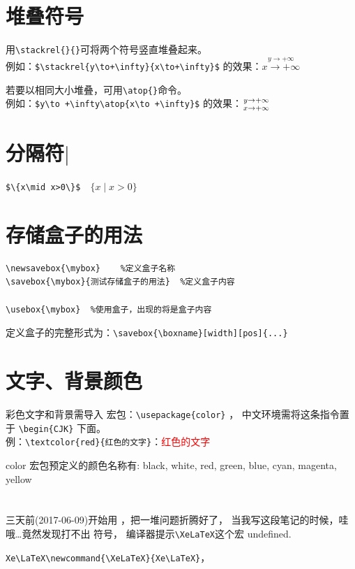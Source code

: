 \documentclass[a4paper,11pt]{article}
\begin{document}
\section{堆叠符号}
用\verb+\stackrel{}{}+可将两个符号竖直堆叠起来。\\
例如：\verb|$\stackrel{y\to+\infty}{x\to+\infty}$|
的效果：$\stackrel{y\to +\infty}{x\to +\infty}$

若要以相同大小堆叠，可用\verb+\atop{}+命令。\\
例如：\verb|$y\to +\infty\atop{x\to +\infty}$|
的效果：$y\to +\infty\atop{x\to +\infty}$

\section{分隔符$\mid$}
\verb+$\{x\mid x>0\}$+$\quad\{x\mid x>0\}$

\section{存储盒子的用法}
\begin{Verbatim}
\newsavebox{\mybox}    %定义盒子名称
\savebox{\mybox}{测试存储盒子的用法}  %定义盒子内容

\usebox{\mybox}  %使用盒子，出现的将是盒子内容
\end{Verbatim}
定义盒子的完整形式为：\verb+\savebox{\boxname}[width][pos]{...}+

\section{文字、背景颜色}
彩色文字和背景需导入  宏包：\verb+\usepackage{color}+ ，
中文环境需将这条指令置于 \verb+\begin{CJK}+ 下面。\\
例：\verb+\textcolor{red}{红色的文字}+：\textcolor{red}{红色的文字}

color 宏包预定义的颜色名称有: black, white, red, green, blue, cyan,
magenta, yellow

\section{\XeLaTeX}
三天前(2017-06-09)开始用 \XeLaTeX ，把一堆问题折腾好了，
当我写这段笔记的时候，哇哦\ldots 竟然发现打不出 \XeLaTeX 符号，
编译器提示\verb+\XeLaTeX+这个宏 undefined.

\verb+Xe\LaTeX+\verb+\newcommand{\XeLaTeX}{Xe\LaTeX}+，
\end{document}

